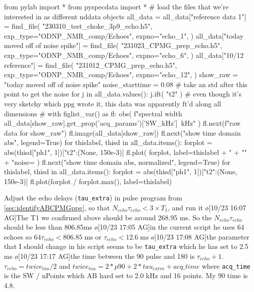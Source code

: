 \begin{python}[on]
from pylab import *
from pyspecdata import *
# {{{ load the files that we're interested in as different nddata objects
all_data = {}
all_data["reference data 1"] = find_file(
    "230310_test_choke_3p9_echo.h5",
    exp_type="ODNP_NMR_comp/Echoes",
    expno="echo_1",
)
all_data["today moved off of noise spike"] = find_file(
    "231023_CPMG_prep_echo.h5",
    exp_type="ODNP_NMR_comp/Echoes",
    expno="echo_6",
)
all_data["10/12 reference"] = find_file(
    "231012_CPMG_prep_echo.h5",
    exp_type="ODNP_NMR_comp/Echoes",
    expno="echo_12",
)
show_raw = "today moved off of noise spike"
noise_starttime = 0.08 # take an std after this point to get the noise
for j in all_data.values():
    j.ift(
        "t2"
    )  # even though it's very sketchy which ppg wrote it, this data was apparently ft'd along all dimensions
# }}}
with figlist_var() as fl:
    obs(
        f"spectral width {all_data[show_raw].get_prop('acq_params')['SW_kHz']}~kHz"
    )
    fl.next(f"raw data for {show_raw}")
    fl.image(all_data[show_raw])
    fl.next("show time domain abs", legend=True)
    for thislabel, thisd in all_data.items():
        forplot = abs(thisd["ph1", 1])["t2":(None, 150e-3)]
        fl.plot(
            forplot,
            label=thislabel
            + "\n%
            + "\n"
            + "noise= %
        )
    fl.next("show time domain abs, normalized", legend=True)
    for thislabel, thisd in all_data.items():
        forplot = abs(thisd["ph1", 1])["t2":(None, 150e-3)]
        fl.plot(forplot / forplot.max(), label=thislabel)
\end{python}
\par
Adjust the echo delays (\texttt{tau_extra}) in pulse program from \cref{sec:identifyABCPMGppg}, so that $N_{echo}\tau_{echo} < 3\times T_1$, and run it
\o[10/23 16:07 AG]{The T1 we confirmed above should be around 268.95 ms. So the $N_{echo}\tau_{echo}$ should be less than 806.85ms}
\o[10/23 17:05 AG]{in the current script he uses 64 echoes so $64\tau_{echo} < 806.85\;\text{ms}$ or $\tau_{echo} < 12.6\;\text{ms}$}
\o[10/23 17:08 AG]{the parameter that I should change in his script seems to be \texttt{tau_extra} which he has set to 2.5 ms}
\o[10/23 17:17 AG]{the time between the 90 pulse and 180 is $\tau_{echo} + 1$. $\tau_{echo} = twice_{tau}/2$ and $twice_{tau} = 2*p90 + 2 * tau_{extra} + acq\_time$ where \texttt{acq_time} is the SW / nPoints which AB hard set to 2.0 kHz and 16 points. My 90 time is 4.8.}
